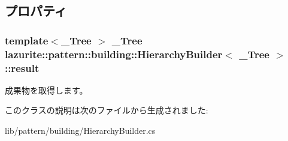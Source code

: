 \subsection{プロパティ}
\hypertarget{classlazurite_1_1pattern_1_1building_1_1_hierarchy_builder_3_01___tree_01_4_a51789f7637e2bd5b35aae74d53d0e799}{
\subsubsection[{result}]{\setlength{\rightskip}{0pt plus 5cm}template$<$\_\-Tree $>$ \_\-Tree lazurite::pattern::building::HierarchyBuilder$<$ \_\-Tree $>$::result}}
\label{classlazurite_1_1pattern_1_1building_1_1_hierarchy_builder_3_01___tree_01_4_a51789f7637e2bd5b35aae74d53d0e799}


成果物を取得します。 

このクラスの説明は次のファイルから生成されました:\begin{DoxyCompactItemize}
\item 
lib/pattern/building/HierarchyBuilder.cs\end{DoxyCompactItemize}
